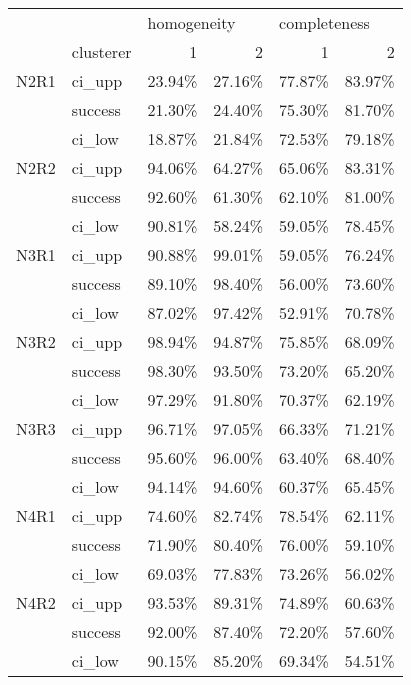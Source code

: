 \begin{tabular}{llrrrr}
\toprule
     & {} & \multicolumn{2}{l}{homogeneity} & \multicolumn{2}{l}{completeness} \\
     & clusterer &           1 &      2 &            1 &      2 \\
\midrule
N2R1 & ci\_upp &      23.94\% & 27.16\% &       77.87\% & 83.97\% \\
     & success &      21.30\% & 24.40\% &       75.30\% & 81.70\% \\
     & ci\_low &      18.87\% & 21.84\% &       72.53\% & 79.18\% \\
N2R2 & ci\_upp &      94.06\% & 64.27\% &       65.06\% & 83.31\% \\
     & success &      92.60\% & 61.30\% &       62.10\% & 81.00\% \\
     & ci\_low &      90.81\% & 58.24\% &       59.05\% & 78.45\% \\
N3R1 & ci\_upp &      90.88\% & 99.01\% &       59.05\% & 76.24\% \\
     & success &      89.10\% & 98.40\% &       56.00\% & 73.60\% \\
     & ci\_low &      87.02\% & 97.42\% &       52.91\% & 70.78\% \\
N3R2 & ci\_upp &      98.94\% & 94.87\% &       75.85\% & 68.09\% \\
     & success &      98.30\% & 93.50\% &       73.20\% & 65.20\% \\
     & ci\_low &      97.29\% & 91.80\% &       70.37\% & 62.19\% \\
N3R3 & ci\_upp &      96.71\% & 97.05\% &       66.33\% & 71.21\% \\
     & success &      95.60\% & 96.00\% &       63.40\% & 68.40\% \\
     & ci\_low &      94.14\% & 94.60\% &       60.37\% & 65.45\% \\
N4R1 & ci\_upp &      74.60\% & 82.74\% &       78.54\% & 62.11\% \\
     & success &      71.90\% & 80.40\% &       76.00\% & 59.10\% \\
     & ci\_low &      69.03\% & 77.83\% &       73.26\% & 56.02\% \\
N4R2 & ci\_upp &      93.53\% & 89.31\% &       74.89\% & 60.63\% \\
     & success &      92.00\% & 87.40\% &       72.20\% & 57.60\% \\
     & ci\_low &      90.15\% & 85.20\% &       69.34\% & 54.51\% \\

\end{tabular}

